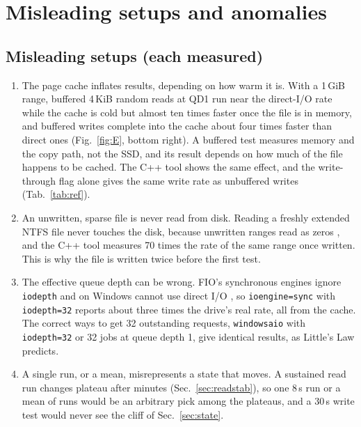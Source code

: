 \documentclass{article}
\begin{document}
\section{Misleading setups and anomalies}\label{sec:pitan}
\subsection{Misleading setups (each measured)}\label{sec:pitfalls}
\begin{table}[!htb]\centering\small
\caption{Independent C++ tool, medians of 3 runs of 8--10\,s per mode over a 1\,GiB range, except the sparse-file test. The buffered and unwritten-file cases are the misleading ones; the buffered read is partly cold here.}\label{tab:ref}\end{table}
\begin{enumerate}
  \item The page cache inflates results, depending on how warm it is. With a 1\,GiB range, buffered 4\,KiB random reads at QD1 run near the direct-I/O rate while the cache is cold but almost ten times faster once the file is in memory, and buffered writes complete into the cache about four times faster than direct ones (Fig.~\ref{fig:E}, bottom right). A buffered test measures memory and the copy path, not the SSD, and its result depends on how much of the file happens to be cached. The C++ tool shows the same effect, and the write-through flag alone gives the same write rate as unbuffered writes (Tab.~\ref{tab:ref}).
  \item An unwritten, sparse file is never read from disk. Reading a freshly extended NTFS file never touches the disk, because unwritten ranges read as zeros \cite{mssparse}, and the C++ tool measures 70 times the rate of the same range once written. This is why the file is written twice before the first test.
  \item The effective queue depth can be wrong. FIO's synchronous engines ignore \texttt{iodepth} and on Windows cannot use direct I/O \cite{fiodoc}, so \texttt{ioengine=sync} with \texttt{iodepth=32} reports about three times the drive's real rate, all from the cache. The correct ways to get 32 outstanding requests, \texttt{windowsaio} with \texttt{iodepth=32} or 32 jobs at queue depth 1, give identical results, as Little's Law predicts.
  \item A single run, or a mean, misrepresents a state that moves. A sustained read run changes plateau after minutes (Sec.~\ref{sec:readstab}), so one 8\,s run or a mean of runs would be an arbitrary pick among the plateaus, and a 30\,s write test would never see the cliff of Sec.~\ref{sec:state}.
\end{enumerate}
\end{document}
